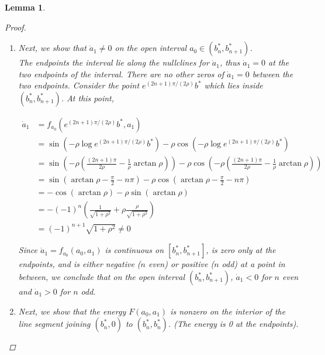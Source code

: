 \documentclass[12pt]{article}
\newtheorem{lemma}{Lemma}
\begin{document}
\begin{lemma}
\begin{proof}
\begin{enumerate}
Since $\rho > 0$, $b^*_n < e^{n \pi/\rho}$. We also have 

\begin{equation*}
b^*_{n+1} = \exp\left(\frac{\pi}{\rho} \right) b^*_n = \exp\left(\frac{n \pi}{\rho} \right) \exp \left( \frac{1}{\rho}(\pi - \arctan \rho)\right)
\end{equation*}

Since $\arctan \rho \in (-\pi/2, \pi/2)$, $e^{n \pi/\rho} < b^*_{n+1}$.

\item Next, we show that $\dot a_1 \neq 0$ on the open interval 
$a_0 \in (b^*_n, b^*_{n+1})$.\\

The endpoints the interval lie along the nullclines for $\dot a_1$, thus $\dot a_1 = 0$ at the two endpoints of the interval. There are no other zeros of $\dot a_1 = 0$ between the two endpoints. Consider the point $e^{(2n+1)\pi/(2\rho) }b^*$ which lies inside $(b^*_n, b^*_{n+1})$. At this point,

\begin{align*}
\dot a_1 &= f_{a_0}(e^{(2n+1) \pi / (2\rho)}b^*, a_1) \\
&= \sin(-\rho \log e^{(2n+1) \pi / (2\rho)} b^* ) - \rho \cos( -\rho \log e^{(2n+1) \pi / (2\rho)} b^* ) \\
&= \sin\left(-\rho \left( \frac{(2n + 1)\pi}{2\rho} - \frac{1}{\rho} \arctan \rho \right) \right) - \rho \cos\left(-\rho \left( \frac{(2n + 1)\pi}{2\rho} - \frac{1}{\rho} \arctan \rho \right) \right) \\
&= \sin\left(\arctan \rho - \frac{\pi}{2} - n \pi \right) - \rho \cos\left(\arctan \rho - \frac{\pi}{2} - n \pi \right) \\
&= -\cos\left(\arctan \rho \right) - \rho \sin\left(\arctan \rho\right) \\
&= -(-1)^n \left( \frac{1}{\sqrt{1+\rho^2}} + \rho \frac{\rho}{\sqrt{1+\rho^2}}  \right) \\
&= (-1)^{n+1}\sqrt{1 + \rho^2} \neq 0
\end{align*}

Since $\dot a_1 = f_{a_0}(a_0, a_1)$ is continuous on $[b^*_n, b^*_{n+1}]$, is zero only at the endpoints, and is either negative ($n$ even) or positive ($n$ odd) at a point in between, we conclude that on the open interval $(b^*_n, b^*_{n+1})$, $\dot a_1 < 0$ for $n$ even and $\dot a_1 > 0$ for $n$ odd.

\item Next, we show that the energy $F(a_0, a_1)$ is nonzero on the interior of the line segment joining $(b^*_n, 0)$ to $(b^*_n, b^*_n)$. (The energy is 0 at the endpoints).\\


\end{enumerate}
\end{proof}
\end{lemma}
\end{document}
